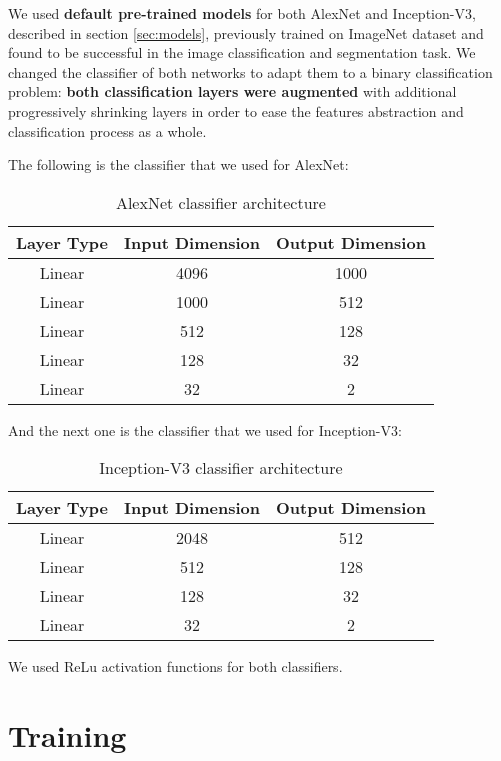 \par
We used \textbf{default pre-trained models} for both AlexNet and Inception-V3, described in section \ref{sec:models}, previously trained on ImageNet dataset and found to be successful in the image classification and segmentation task. We changed the classifier of both networks to adapt them to a binary classification problem: \textbf{both classification layers were augmented} with additional progressively shrinking layers in order to ease the features abstraction and classification process as a whole.

\par
The following is the classifier that we used for AlexNet:
\begin{table}[H]
\centering
\begin{tabular}{|c|c|c|}
\hline
\textbf{Layer Type} & \textbf{Input Dimension} & \textbf{Output Dimension} \\
\hline
Linear & 4096 & 1000 \\
Linear & 1000 & 512 \\
Linear & 512 & 128 \\
Linear & 128 & 32 \\
Linear & 32 & 2 \\
\hline
\end{tabular}
\caption{AlexNet classifier architecture}
\label{tab:layer-dimensions}
\end{table}

And the next one is the classifier that we used for Inception-V3:
\begin{table}[H]
\centering
\begin{tabular}{|c|c|c|}
\hline
\textbf{Layer Type} & \textbf{Input Dimension} & \textbf{Output Dimension} \\
\hline
Linear & 2048 & 512 \\
Linear & 512 & 128 \\
Linear & 128 & 32 \\
Linear & 32 & 2 \\
\hline
\end{tabular}
\caption{Inception-V3 classifier architecture}
\label{tab:layer-dimensions}
\end{table}

We used ReLu activation functions for both classifiers.

\section{Training}

